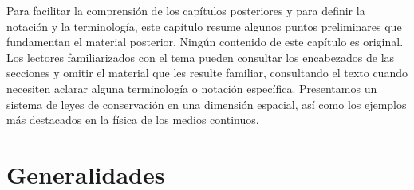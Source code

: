 Para facilitar la comprensión de los capítulos posteriores y para
definir la notación y la terminología, este capítulo resume algunos
puntos preliminares que fundamentan el material posterior.
Ningún contenido de este capítulo es original.
Los lectores familiarizados con el tema pueden consultar los
encabezados de las secciones y omitir el material que les resulte
familiar, consultando el texto cuando necesiten aclarar alguna
terminología o notación específica.
Presentamos un sistema de leyes de conservación en una dimensión
espacial, así como los ejemplos más destacados en la física de los
medios continuos.

\section{Generalidades}

